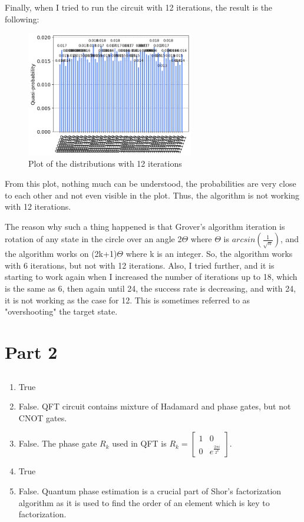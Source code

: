 \documentclass[12pt]{article}
\begin{document}
Finally, when I tried to run the circuit with 12 iterations, the result is the following:

\begin{figure}[H]
    \centering
    \includegraphics[width=0.65\textwidth]{distribution12.png}
    \caption{Plot of the distributions with 12 iterations}
\end{figure}

From this plot, nothing much can be understood, the probabilities are very close to each other and not even visible in the plot. Thus, the algorithm is not working with 12 iterations. 

The reason why such a thing happened is that Grover's algorithm iteration is rotation of any state in the circle over an angle 2$\Theta$ where $\Theta$ is $ arcsin(\frac{1}{\sqrt{n}}) $,  and the algorithm works on (2k+1)$\Theta$ where k is an integer. So, the algorithm works with 6 iterations, but not with 12 iterations. 
Also, I tried further, and it is starting to work again when I increased the number of iterations up to 18, which is the same as 6, then again until 24, the success rate is decreasing, and with 24, it is not working as the case for 12. This is sometimes referred to as "overshooting" the target state.

\section*{Part 2}


\subsection*{}

\begin{enumerate}
    \item True
    \item False. QFT circuit contains mixture of Hadamard and phase gates, but not CNOT gates.
    \item False. The phase gate $R_k$ used in QFT is $ R_k = \begin{bmatrix} 1 & 0 \\ 0 & e^{\frac{2 \pi i}{2^k}} \end{bmatrix} $. 
    \item True
    \item False. Quantum phase estimation is a crucial part of Shor's factorization algorithm as it is used to find the order of an element which is key to factorization.
\end{enumerate}
\end{document}
